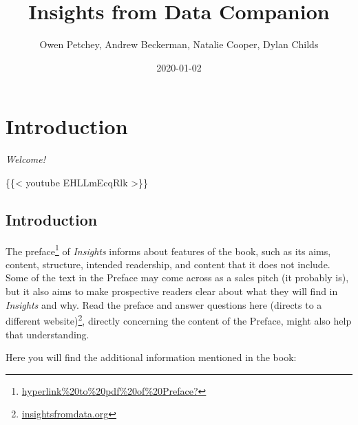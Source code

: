 \documentclass[]{book}
\title{Insights from Data Companion}
\author{Owen Petchey, Andrew Beckerman, Natalie Cooper, Dylan Childs}
\date{2020-01-02}
\newenvironment{Shaded}{\begin{snugshade}}{\end{snugshade}}
\newcommand{\DataTypeTok}[1]{\textcolor[rgb]{0.13,0.29,0.53}{#1}}
\newcommand{\KeywordTok}[1]{\textcolor[rgb]{0.13,0.29,0.53}{\textbf{#1}}}
\newcommand{\NormalTok}[1]{#1}
\newcommand{\OperatorTok}[1]{\textcolor[rgb]{0.81,0.36,0.00}{\textbf{#1}}}
\newcommand{\OtherTok}[1]{\textcolor[rgb]{0.56,0.35,0.01}{#1}}
\renewcommand{\href}[2]{#2\footnote{\url{#1}}}
\begin{document}
\maketitle




{
\setcounter{tocdepth}{1}
\tableofcontents
}
\hypertarget{introduction}{%
\chapter{Introduction}\label{introduction}}

\begin{Shaded}
\end{Shaded}

\emph{Welcome!}

\{\{\textless{} youtube EHLLmEcqRlk \textgreater{}\}\}

\hypertarget{introduction-1}{%
\section{Introduction}\label{introduction-1}}

The \href{hyperlink\%20to\%20pdf\%20of\%20Preface?}{preface} of \emph{Insights} informs about features of the book, such as its aims, content, structure, intended readership, and content that it does not include. Some of the text in the Preface may come across as a sales pitch (it probably is), but it also aims to make prospective readers clear about what they will find in \emph{Insights} and why. Read the preface and answer \href{insightsfromdata.org}{questions here (directs to a different website)}, directly concerning the content of the Preface, might also help that understanding.

Here you will find the additional information mentioned in the book:
\end{document}
